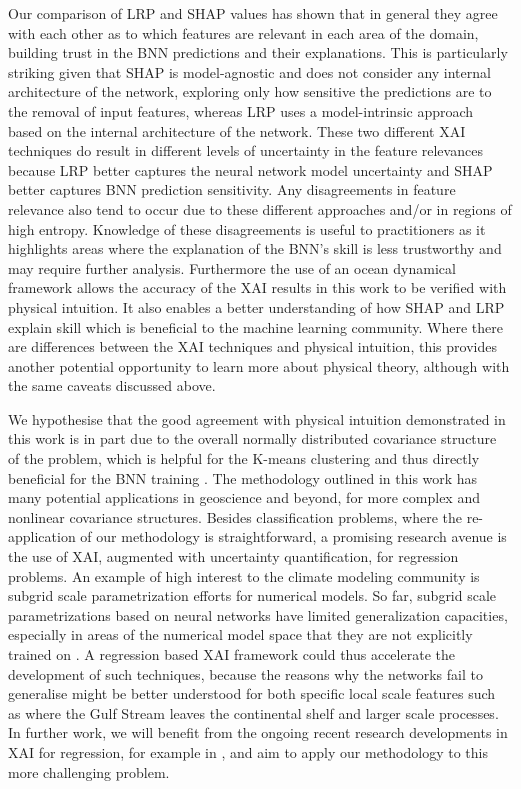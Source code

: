 \documentclass[a4paper]{article}
\begin{document}
Our comparison of LRP and SHAP values has shown that in general they agree with each other as to which features are relevant in each area of the domain, building trust in the BNN predictions and their explanations. This is particularly striking given that SHAP is model-agnostic and does not consider any internal architecture of the network, exploring only how sensitive the predictions are to the removal of input features, whereas LRP uses a model-intrinsic approach based on the internal architecture of the network. These two different XAI techniques do result in different levels of uncertainty in the feature relevances because LRP better captures the neural network model uncertainty and SHAP better captures BNN prediction sensitivity. Any disagreements in feature relevance also tend to occur due to these different approaches and/or in regions of high entropy. Knowledge of these disagreements is useful to practitioners as it highlights areas where the explanation of the BNN's skill is less trustworthy and may require further analysis. Furthermore the use of an ocean dynamical framework allows the accuracy of the XAI results in this work to be verified with physical intuition. It also enables a better understanding of how SHAP and LRP explain skill which is beneficial to the machine learning community. Where there are differences between the XAI techniques and physical intuition, this provides another potential opportunity to learn more about physical theory, although with the same caveats discussed above.

We hypothesise that the good agreement with physical intuition demonstrated in this work is in part due to the overall normally distributed covariance structure of the problem, which is helpful for the K-means clustering and thus directly beneficial for the BNN training \citep{sonnewald2019unsupervised}. The methodology outlined in this work has many potential applications in geoscience and beyond, for more complex and nonlinear covariance structures. Besides classification problems, where the re-application of our methodology is straightforward, a promising research avenue is the use of XAI, augmented with uncertainty quantification, for regression problems. An example of high interest to the climate modeling community is subgrid scale parametrization efforts for numerical models. So far, subgrid scale parametrizations based on neural networks have limited generalization capacities, especially in areas of the numerical model space that they are not explicitly trained on \citep{bolton2019applications}. A regression based XAI framework could thus accelerate the development of such techniques, because the reasons why the networks fail to generalise might be better understood for both specific local scale features such as where the Gulf Stream leaves the continental shelf and larger scale processes. In further work, we will benefit from the ongoing recent research developments in XAI for regression, for example in \cite{letzgus2021toward}, and aim to apply our methodology to this more challenging problem. 
\end{document}
